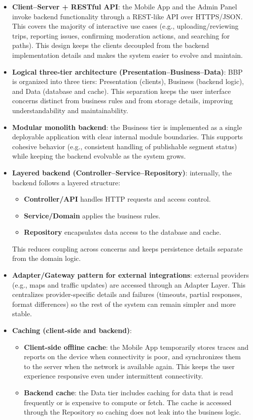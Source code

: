 \begin{itemize}
	\item \textbf{Client--Server + RESTful API}: the Mobile App and the Admin Panel invoke backend functionality through a REST-like API over HTTPS/JSON. This covers the majority of interactive use cases (e.g., uploading/reviewing trips, reporting issues, confirming moderation actions, and searching for paths). This design keeps the clients decoupled from the backend implementation details and makes the system easier to evolve and maintain.
	\item \textbf{Logical three-tier architecture (Presentation--Business--Data)}: BBP is organized into three tiers: Presentation (clients), Business (backend logic), and Data (database and cache). This separation keeps the user interface concerns distinct from business rules and from storage details, improving understandability and maintainability.
	\item \textbf{Modular monolith backend}: the Business tier is implemented as a single deployable application with clear internal module boundaries. This supports cohesive behavior (e.g., consistent handling of publishable segment status) while keeping the backend evolvable as the system grows.
	\item \textbf{Layered backend (Controller--Service--Repository)}: internally, the backend follows a layered structure:
	\begin{itemize}
		\item \textbf{Controller/API} handles HTTP requests and access control.
		\item \textbf{Service/Domain} applies the business rules.
		\item \textbf{Repository} encapsulates data access to the database and cache.
	\end{itemize}
	This reduces coupling across concerns and keeps persistence details separate from the domain logic.
	\item \textbf{Adapter/Gateway pattern for external integrations}: external providers (e.g., maps and traffic updates) are accessed through an Adapter Layer. This centralizes provider-specific details and failures (timeouts, partial responses, format differences) so the rest of the system can remain simpler and more stable.
	\item \textbf{Caching (client-side and backend)}:
	\begin{itemize}
		\item \textbf{Client-side offline cache}: the Mobile App temporarily stores traces and reports on the device when connectivity is poor, and synchronizes them to the server when the network is available again. This keeps the user experience responsive even under intermittent connectivity.
		\item \textbf{Backend cache}: the Data tier includes caching for data that is read frequently or is expensive to compute or fetch. The cache is accessed through the Repository so caching does not leak into the business logic.
	\end{itemize}
\end{itemize}

